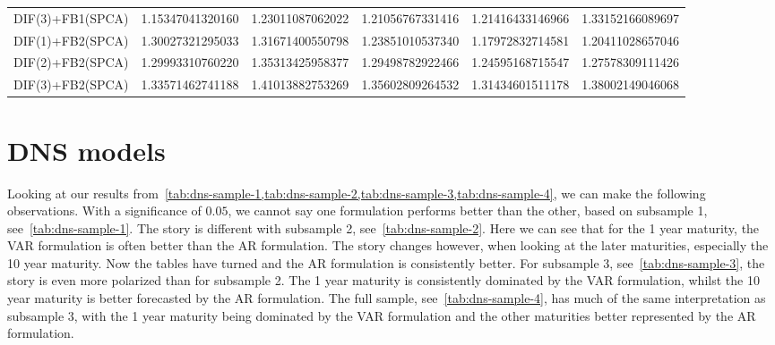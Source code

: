 \begin{table}[H]
\begin{adjustbox}{totalheight=\baselineskip}
\begin{tabular}{lSSSSS}
DIF(3)+FB1(SPCA) & 1.15347041320160 & 1.23011087062022 & 1.21056767331416 & 1.21416433146966 & 1.33152166089697 \\ 
DIF(1)+FB2(SPCA) & 1.30027321295033 & 1.31671400550798 & 1.23851010537340 & 1.17972832714581 & 1.20411028657046 \\ 
DIF(2)+FB2(SPCA) & 1.29993310760220 & 1.35313425958377 & 1.29498782922466 & 1.24595168715547 & 1.27578309111426 \\ 
DIF(3)+FB2(SPCA) & 1.33571462741188 & 1.41013882753269 & 1.35602809264532 & 1.31434601511178 & 1.38002149046068 \\ \bottomrule 
\end{tabular}
\end{adjustbox}
\end{table}

\section{DNS models}
Looking at our results from~\cref{tab:dns-sample-1,tab:dns-sample-2,tab:dns-sample-3,tab:dns-sample-4}, we can make the following observations. 
With a significance of $0.05$, we cannot say one formulation performs better than the other, based on subsample 1, see~\cref{tab:dns-sample-1}. 
The story is different with subsample 2, see~\cref{tab:dns-sample-2}. 
Here we can see that for the 1 year maturity, the VAR formulation is often better than the AR formulation.
The story changes however, when looking at the later maturities, especially the 10 year maturity.
Now the tables have turned and the AR formulation is consistently better.
For subsample 3, see~\cref{tab:dns-sample-3}, the story is even more polarized than for subsample 2. 
The 1 year maturity is consistently dominated by the VAR formulation, whilst the 10 year maturity is better forecasted by the AR formulation. 
The full sample, see~\cref{tab:dns-sample-4}, has much of the same interpretation as subsample 3, with the 1 year maturity being dominated by the VAR formulation and the other maturities better represented by the AR formulation.

